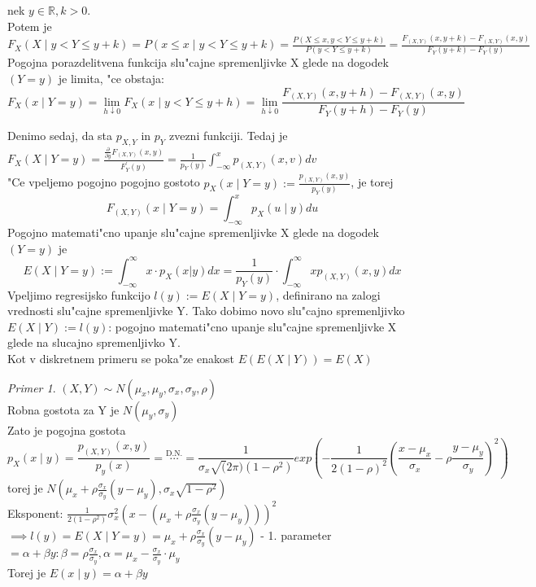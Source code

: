 \documentclass[a4paper,12pt]{article}
\theoremstyle{definition}
\theoremstyle{remark}
\newtheorem*{ex}{Primer}
\newcommand{\R}{\mathbb{R}}
\begin{document}
\begin{enumerate}[label=\Alph*]
        nek $y \in \R, k > 0$. \\
        Potem je $F_X(X \mid y < Y \leq y+k) = P(x \leq x \mid y < Y \leq y+k) =
        \frac{P(X \leq x, y < Y \leq y+k)}{P(y < Y \leq y+k)} = \frac{F_{(X,Y)}(x,y+k) - F_{(X,Y)}(x,y)}{F_Y(y+k) - F_Y(y)}$ \\
        Pogojna porazdelitvena funkcija slu"cajne spremenljivke X glede na dogodek $(Y=y)$ je limita, "ce obstaja:
        \[F_X(x \mid Y=y) = \lim_{h \downarrow 0} F_X(x \mid y < Y \leq y+h) = \lim_{h \downarrow 0}
        \frac{F_{(X,Y)}(x,y+h) - F_{(X,Y)}(x,y)}{F_Y(y+h) - F_Y(y)}\]




        Denimo sedaj, da sta $p_{X,Y}$ in $p_Y$ zvezni funkciji. Tedaj je $F_X(X \mid Y=y) = 
        \frac{\frac{\partial}{\partial y} F_{(X,Y)}(x,y)}{F_Y^{'}(y)} = \frac{1}{p_Y(y)}
        \int_{-\infty}^x p_{(X,Y)}(x,v) dv$ \\
        "Ce vpeljemo pogojno pogojno gostoto $p_X(x \mid Y=y) := \frac{p_{(X,Y)}(x,y)}{p_Y(y)}$, je torej
        \[F_{(X,Y)}(x \mid Y=y) = \int_{-\infty}^x p_X(u \mid y) du \]
        Pogojno matemati"cno upanje slu"cajne spremenljivke X glede na dogodek $(Y=y)$ je 
        \[E(X \mid Y=y) :=
        \int_{-\infty}^{\infty} x \cdot p_X(x|y) dx = \frac{1}{p_Y(y)} \cdot \int_{-\infty}^{\infty}
        x p_{(X,Y)}(x,y) dx\]
        Vpeljimo regresijsko funkcijo $l(y) := E(X \mid Y=y)$, definirano na zalogi vrednosti slu"cajne spremenljivke Y.
        Tako dobimo novo slu"cajno spremenljivko $E(X \mid Y) := l(y)$: pogojno matemati"cno upanje slu"cajne spremenljivke
        X glede na slucajno spremenljivko Y. \\
        Kot v diskretnem primeru se poka"ze enakost $E(E(X \mid Y)) = E(X)$

        \begin{ex}
            $(X,Y) \sim N(\mu_x,\mu_y,\sigma_x,\sigma_y,\rho)$ \\
            Robna gostota za Y je $N(\mu_y,\sigma_y)$ \\
            Zato je pogojna gostota
            \[p_X(x \mid y) = \frac{p_{(X,Y)}(x,y)}{p_y(x)} = \stackrel{\text{D.N.}}{\cdots} = \frac{1}{\sigma_x \sqrt(2\pi) (1-\rho^2)}
            exp(-\frac{1}{2 (1-\rho)^2} (\frac{x-\mu_x}{\sigma_x} - \rho \frac{y-\mu_y}{\sigma_y})^2)\]
            torej je $N(\mu_x + \rho \frac{\sigma_x}{\sigma_y}(y-\mu_y), \sigma_x \sqrt{1 - \rho^2})$ \\
            Eksponent: $\frac{1}{2 (1 -\rho^2)} \sigma_x^2 (x - (\mu_x + \rho \frac{\sigma_x}{\sigma_y} (y-\mu_y)))^2$ \\
            $\implies l(y) = E(X \mid Y=y) = \mu_x + \rho \frac{\sigma_x}{\sigma_y} (y - \mu_y)$ - 1. parameter \\
            $= \alpha + \beta y: \beta = \rho \frac{\sigma_x}{\sigma_y}, \alpha = \mu_x - \frac{\sigma_x}{\sigma_y} \cdot \mu_y$ \\
            Torej je $E(x \mid y) = \alpha + \beta y$
        \end{ex}


\end{enumerate}
\end{document}

